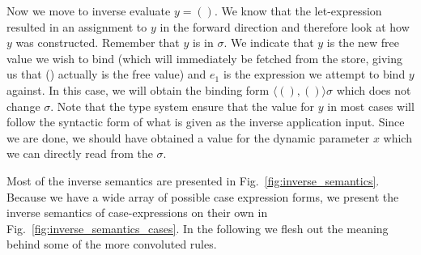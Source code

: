 Now we move to inverse evaluate $y = ()$. We know that the let-expression
resulted in an assignment to $y$ in the forward direction and therefore look
at how $y$ was constructed. Remember that $y$ is in $\sigma$. We indicate that
$y$ is the new free value we wish to bind (which will immediately be fetched
from the store, giving us that () actually is the free value) and $e_1$ is the
expression we attempt to bind $y$ against. In this case, we will obtain the
binding form $\langle (), () \rangle \sigma$ which does not change $\sigma$.
Note that the type system ensure that the value for $y$ in most cases will
follow the syntactic form of what is given as the inverse application input.
Since we are done, we should have obtained a value for the dynamic parameter
$x$ which we can directly read from the $\sigma$.

Most of the inverse semantics are presented in
Fig.~\ref{fig:inverse_semantics}. Because we have a wide array of possible case
expression forms, we present the inverse semantics of case-expressions on their
own in Fig.~\ref{fig:inverse_semantics_cases}. In the following we flesh out
the meaning behind some of the more convoluted rules.

